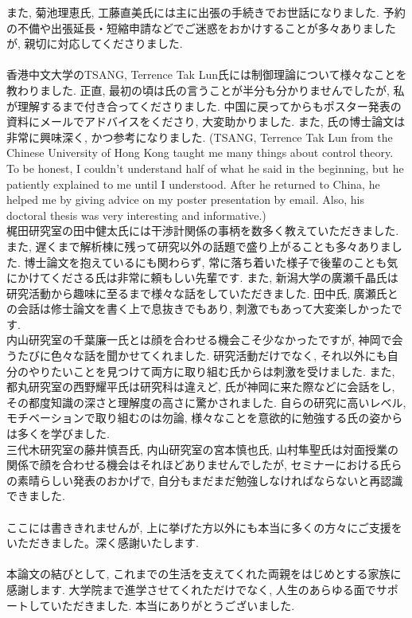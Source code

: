 \quad また, 菊池理恵氏, 工藤直美氏には主に出張の手続きでお世話になりました. 予約の不備や出張延長・短縮申請などでご迷惑をおかけすることが多々ありましたが, 親切に対応してくださりました. \\\\
\quad 香港中文大学のTSANG, Terrence Tak Lun氏には制御理論について様々なことを教わりました. 正直, 最初の頃は氏の言うことが半分も分かりませんでしたが, 私が理解するまで付き合ってくださりました. 中国に戻ってからもポスター発表の資料にメールでアドバイスをくださり, 大変助かりました. また, 氏の博士論文は非常に興味深く, かつ参考になりました. (TSANG, Terrence Tak Lun from the Chinese University of Hong Kong taught me many things about control theory. To be honest, I couldn't understand half of what he said in the beginning, but he patiently explained to me until I understood. After he returned to China, he helped me by giving advice on my poster presentation by email. Also, his doctoral thesis was very interesting and informative.)\\
\quad 梶田研究室の田中健太氏には干渉計関係の事柄を数多く教えていただきました. また, 遅くまで解析棟に残って研究以外の話題で盛り上がることも多々ありました. 博士論文を抱えているにも関わらず, 常に落ち着いた様子で後輩のことも気にかけてくださる氏は非常に頼もしい先輩です. また, 新潟大学の廣瀬千晶氏は研究活動から趣味に至るまで様々な話をしていただきました. 田中氏, 廣瀬氏との会話は修士論文を書く上で息抜きでもあり, 刺激でもあって大変楽しかったです. \\
\quad 内山研究室の千葉廉一氏とは顔を合わせる機会こそ少なかったですが, 神岡で会うたびに色々な話を聞かせてくれました. 研究活動だけでなく, それ以外にも自分のやりたいことを見つけて両方に取り組む氏からは刺激を受けました. また, 都丸研究室の西野耀平氏は研究科は違えど, 氏が神岡に来た際などに会話をし, その都度知識の深さと理解度の高さに驚かされました. 自らの研究に高いレベル, モチベーションで取り組むのは勿論, 様々なことを意欲的に勉強する氏の姿からは多くを学びました. \\
\quad 三代木研究室の藤井慎吾氏, 内山研究室の宮本慎也氏, 山村隼聖氏は対面授業の関係で顔を合わせる機会はそれほどありませんでしたが, セミナーにおける氏らの素晴らしい発表のおかげで, 自分もまだまだ勉強しなければならないと再認識できました. \\\\
\quad ここには書ききれませんが, 上に挙げた方以外にも本当に多くの方々にご支援をいただきました。深く感謝いたします. \\\\
\quad 本論文の結びとして, これまでの生活を支えてくれた両親をはじめとする家族に感謝します. 大学院まで進学させてくれただけでなく, 人生のあらゆる面でサポートしていただきました. 本当にありがとうございました. 